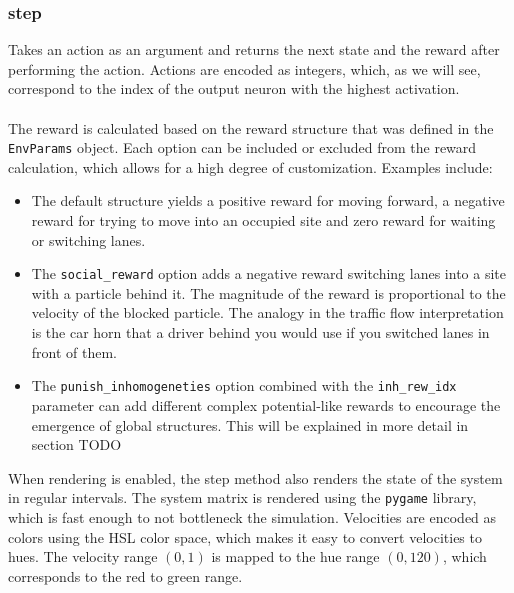 \subsubsection{step}
Takes an action as an argument and returns the next state and the reward after performing the action. Actions are encoded as integers, which, as we will see, correspond to the index of the output neuron with the highest activation. 
\\
\\
The reward is calculated based on the reward structure that was defined in the \texttt{EnvParams} object. Each option can be included or excluded from the reward calculation, which allows for a high degree of customization. Examples include:
\begin{itemize}
    \item The default structure yields a positive reward for moving forward, a negative reward for trying to move into an occupied site and zero reward for waiting or switching lanes. 
    \item The \texttt{social\_reward} option adds a negative reward switching lanes into a site with a particle behind it. The magnitude of the reward is proportional to the velocity of the blocked particle. The analogy in the traffic flow interpretation is the car horn that a driver behind you would use if you switched lanes in front of them.
    \item The \texttt{punish\_inhomogeneties} option combined with the \texttt{inh\_rew\_idx} parameter can add different complex potential-like rewards to encourage the emergence of global structures. This will be explained in more detail in section TODO
\end{itemize}
When rendering is enabled, the step method also renders the state of the system in regular intervals. The system matrix is rendered using the \texttt{pygame} library, which is fast enough to not bottleneck the simulation. Velocities are encoded as colors using the HSL color space, which makes it easy to convert velocities to hues. The velocity range $(0,1)$ is mapped to the hue range $(0,120)$, which corresponds to the red to green range. 



